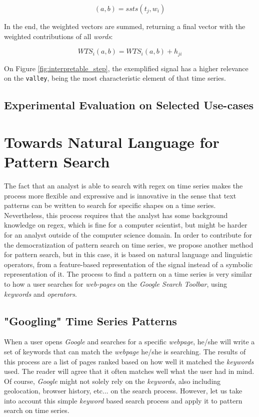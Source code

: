 {\begin{equation}
(a,b) = ssts(t_j, w_i)
\end{equation}

In the end, the  weighted vectors are summed, returning a final vector with the weighted contributions of all \textit{words}:

\begin{equation}
WTS_i(a, b) = WTS_i(a, b) + h_{ji}
\end{equation}

On Figure \ref{fig:interpretable_step}, the exemplified signal has a higher relevance on the \texttt{valley}, being the most characteristic element of that time series.


\subsection{Experimental Evaluation on Selected Use-cases}



\section{Towards Natural Language for Pattern Search}

The fact that an analyst is able to search with \gls{regex} on time series makes the process more flexible and expressive and is innovative in the sense that text patterns can be written to search for specific shapes on a time series. Nevertheless, this process requires that the analyst has some background knowledge on \gls{regex}, which is fine for a computer scientist, but might be harder for an analyst outside of the computer science domain. In order to contribute for the democratization of pattern search on time series, we propose another method for pattern search, but in this case, it is based on natural language and linguistic operators, from a feature-based representation of the signal instead of a symbolic representation of it. The process to find a pattern on a time series is very similar to how a user searches for \textit{web-pages} on the \textit{Google Search Toolbar}, using \textit{keywords} and \textit{operators}.

\subsection{"Googling" Time Series Patterns}

When a user opens \textit{Google} and searches for a specific \textit{webpage}, he/she will write a set of keywords that can match the \textit{webpage} he/she is searching. The results of this process are a list of pages ranked based on how well it matched the \textit{keywords} used. The reader will agree that it often matches well what the user had in mind. Of course, \textit{Google} might not solely rely on the \textit{keywords}, also including geolocation, browser history, etc... on the search process. However, let us take into account this simple \textit{keyword} based search process and apply it to pattern search on time series.

}
